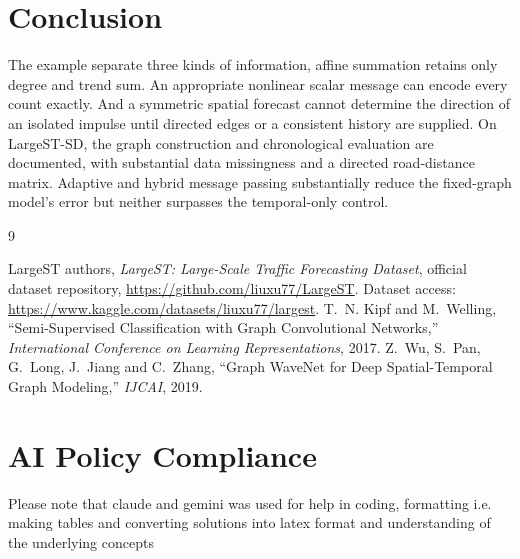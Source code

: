 \documentclass[11pt,a4paper]{article}
\begin{document}
\section{Conclusion}
The  example separate three kinds of information, affine summation retains only degree and trend sum. An appropriate nonlinear scalar message can encode every count exactly. And a symmetric spatial forecast cannot determine the direction of an isolated impulse until directed edges or a consistent history are supplied. On LargeST-SD, the graph construction and chronological evaluation are documented, with substantial data missingness and a directed road-distance matrix. Adaptive and hybrid message passing substantially reduce the fixed-graph model's error but neither surpasses the temporal-only control. 
\begin{thebibliography}{9}

 LargeST authors, \emph{LargeST: Large-Scale Traffic Forecasting Dataset}, official dataset repository, \url{https://github.com/liuxu77/LargeST}. Dataset access: \url{https://www.kaggle.com/datasets/liuxu77/largest}.
 T.~N. Kipf and M.~Welling, ``Semi-Supervised Classification with Graph Convolutional Networks,'' \emph{International Conference on Learning Representations}, 2017.
 Z.~Wu, S.~Pan, G.~Long, J.~Jiang and C.~Zhang, ``Graph WaveNet for Deep Spatial-Temporal Graph Modeling,'' \emph{IJCAI}, 2019.
\end{thebibliography}

\section*{AI Policy Compliance}
Please note that claude and gemini was used for help in coding, formatting i.e. making tables and converting solutions into latex format and understanding of the underlying concepts
\end{document}
